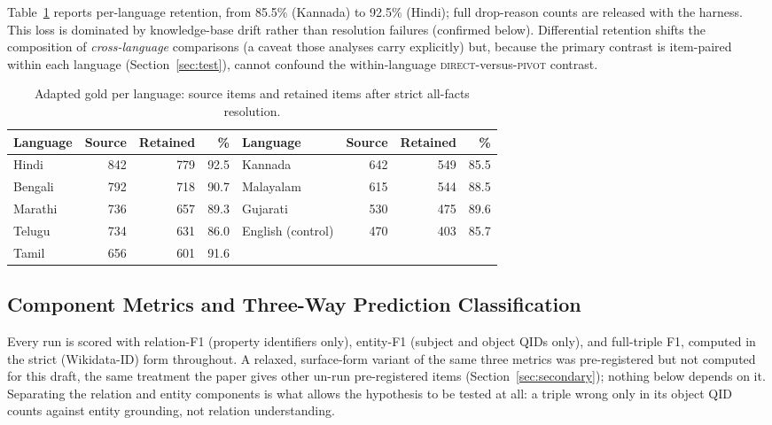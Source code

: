 \documentclass{llncs}
\begin{document}
Table~\ref{tab:gold} reports per-language retention, from 85.5\% (Kannada) to
92.5\% (Hindi); full drop-reason counts are released with the harness. This
loss is dominated by knowledge-base drift rather than resolution failures
(confirmed below). Differential retention shifts the composition of \emph{cross-language}
comparisons (a caveat those analyses carry explicitly) but, because the
primary contrast is item-paired within each language (Section~\ref{sec:test}),
cannot confound the within-language \textsc{direct}-versus-\textsc{pivot}
contrast.

\begin{table}[t]
\centering
\caption{Adapted gold per language: source items and retained items after
strict all-facts resolution.}
\label{tab:gold}
\begin{tabular}{l@{\hskip 4mm}rrr@{\hskip 9mm}l@{\hskip 4mm}rrr}
\toprule
Language & Source & Retained & \% & Language & Source & Retained & \% \\
\midrule
Hindi   & 842 & 779 & 92.5 & Kannada           & 642 & 549 & 85.5 \\
Bengali & 792 & 718 & 90.7 & Malayalam         & 615 & 544 & 88.5 \\
Marathi & 736 & 657 & 89.3 & Gujarati          & 530 & 475 & 89.6 \\
Telugu  & 734 & 631 & 86.0 & English (control) & 470 & 403 & 85.7 \\
Tamil   & 656 & 601 & 91.6 & & & & \\
\bottomrule
\end{tabular}
\end{table}
\FloatBarrier

\subsection{Component Metrics and Three-Way Prediction Classification}
Every run is scored with relation-F1 (property identifiers only), entity-F1
(subject and object QIDs only), and full-triple F1, computed in the strict
(Wikidata-ID) form throughout. A relaxed, surface-form variant of the same
three metrics was pre-registered but not computed for this draft, the same
treatment the paper gives other un-run pre-registered items
(Section~\ref{sec:secondary}); nothing below depends on it. Separating the
relation and entity components is what allows the hypothesis to be tested at
all: a triple wrong only in its object QID counts against entity grounding,
not relation understanding.
\end{document}
